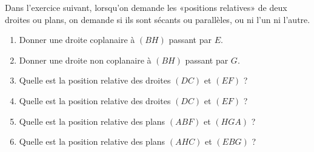 
\begin{exercice}\label{exosmath-0079}

    Dans l'exercice suivant, lorsqu'on demande les «positions relatives» de deux droites ou plans, on demande si ils sont sécants ou parallèles, ou ni l'un ni l'autre.
    \begin{multicols}{2}
        \begin{enumerate}
            \item
        Donner une droite coplanaire à \( (BH)\) passant par \( E\).
    \item
        Donner une droite non coplanaire à \( (BH)\) passant par \( G\).
    \item
        Quelle est la position relative des droites \( (DC)\) et \( (EF)\) ?
    \item
        Quelle est la position relative des droites \( (DC)\) et \( (EF)\) ?
    \item
        Quelle est la position relative des plans \( (ABF)\) et \( (HGA)\) ?
    \item
        Quelle est la position relative des plans \( (AHC)\) et \( (EBG)\) ?
                
        \end{enumerate}
        \columnbreak
        \begin{center}

        \end{center}
    \end{multicols}

\end{exercice}
